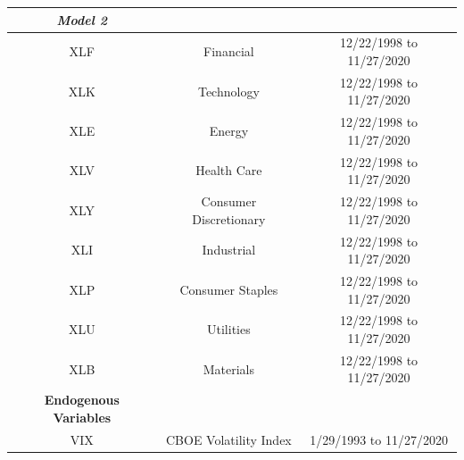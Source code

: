 \documentclass[11pt,a4paper,oldfontcommands]{memoir}
\begin{document}
{\begin{table}[h]
\begin{tabular*}{\textwidth}{c @{\extracolsep{\fill}} ccclll}
{\textit{\textbf{Model 2}}} & \multicolumn{3}{l}{}                                                                                                                                                      \\ \hline
                                                XLF                                   & \multicolumn{3}{c}{Financial}                                 & \multicolumn{3}{c}{12/22/1998 to 11/27/2020} \\ \hline
                                               XLK                                      & \multicolumn{3}{c}{Technology}                                & \multicolumn{3}{c}{12/22/1998 to 11/27/2020} \\ \hline
                                               XLE                                      & \multicolumn{3}{c}{Energy}                                   & \multicolumn{3}{c}{12/22/1998 to 11/27/2020} \\ \hline
                                               XLV                                       & \multicolumn{3}{c}{Health Care}                               & \multicolumn{3}{c}{12/22/1998 to 11/27/2020} \\ \hline
                                               XLY                                       & \multicolumn{3}{c}{Consumer Discretionary}                    & \multicolumn{3}{c}{12/22/1998 to 11/27/2020} \\ \hline
                                               XLI                                       & \multicolumn{3}{c}{Industrial}                                & \multicolumn{3}{c}{12/22/1998 to 11/27/2020} \\ \hline
                                               XLP                                       & \multicolumn{3}{c}{Consumer Staples}                          & \multicolumn{3}{c}{12/22/1998 to 11/27/2020} \\ \hline
                                               XLU                                       & \multicolumn{3}{c}{Utilities}                                 & \multicolumn{3}{c}{12/22/1998 to 11/27/2020} \\ \hline
                                               XLB                                       & \multicolumn{3}{c}{Materials}                                 & \multicolumn{3}{c}{12/22/1998 to 11/27/2020} \\ \hline

\multicolumn{1}{c}{\textbf{Endogenous Variables}}                                                                                                                                                                          \\ \hline \hline 
VIX & \multicolumn{3}{c}{CBOE Volatility Index} & \multicolumn{3}{c}{1/29/1993 to 11/27/2020} \\ \hline
\end{tabular*}
\end{table}



}
\end{document}
